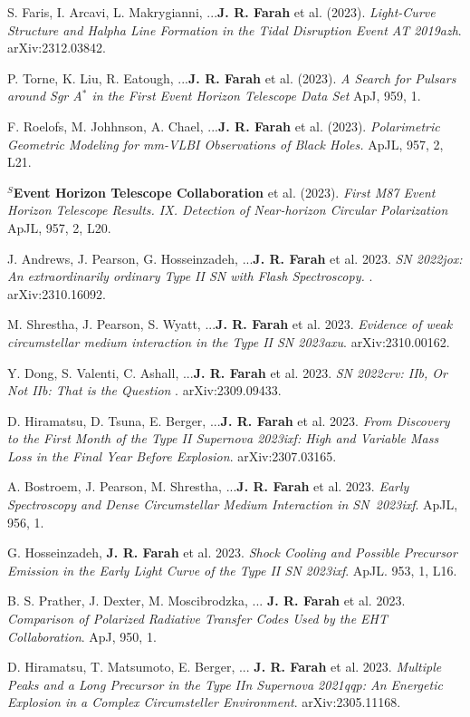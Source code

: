 \documentclass[margin,line]{res}
\begin{document}
\begin{resume}
S. Faris, I. Arcavi, L. Makrygianni, ...\textbf{J. R. Farah} et al. (2023). \textit{Light-Curve Structure and Halpha Line Formation in the Tidal Disruption Event AT 2019azh}. arXiv:2312.03842.

P. Torne, K. Liu, R. Eatough, ...\textbf{J. R. Farah} et al. (2023). \textit{ A Search for Pulsars around Sgr A$^\ast$ in the First Event Horizon Telescope Data Set } ApJ, 959, 1.

F. Roelofs, M. Johhnson, A. Chael, ...\textbf{J. R. Farah} et al. (2023). \textit{ Polarimetric Geometric Modeling for mm-VLBI Observations of Black Holes. } ApJL, 957, 2, L21.

\textbf{$^S$Event Horizon Telescope Collaboration} et al. (2023). \textit{First M87 Event Horizon Telescope Results. IX. Detection of Near-horizon Circular Polarization} ApJL, 957, 2, L20.

J. Andrews, J. Pearson, G. Hosseinzadeh, ...\textbf{J. R. Farah} et al. 2023. \textit{ SN 2022jox: An extraordinarily ordinary Type II SN with Flash Spectroscopy. }. arXiv:2310.16092.

M. Shrestha, J. Pearson, S. Wyatt, ...\textbf{J. R. Farah} et al. 2023. \textit{Evidence of weak circumstellar medium interaction in the Type II SN 2023axu}. arXiv:2310.00162.

Y. Dong, S. Valenti, C. Ashall, ...\textbf{J. R. Farah} et al. 2023. \textit{ SN 2022crv: IIb, Or Not IIb: That is the Question }. arXiv:2309.09433.

D. Hiramatsu, D. Tsuna, E. Berger, ...\textbf{J. R. Farah} et al. 2023. \textit{From Discovery to the First Month of the Type II Supernova 2023ixf: High and Variable Mass Loss in the Final Year Before Explosion}. arXiv:2307.03165.

A. Bostroem, J. Pearson, M. Shrestha, ...\textbf{J. R. Farah} et al. 2023. \textit{Early Spectroscopy and Dense Circumstellar Medium Interaction in SN~2023ixf}. ApJL, 956, 1.

G. Hosseinzadeh, \textbf{J. R. Farah} et al. 2023. \textit{Shock Cooling and Possible Precursor Emission in the Early Light Curve of the Type II SN 2023ixf}. ApJL. 953, 1, L16.  

B. S. Prather, J. Dexter, M. Moscibrodzka,  ... \textbf{J. R. Farah} et al. 2023. \textit{Comparison of Polarized Radiative Transfer Codes Used by the EHT Collaboration}. ApJ, 950, 1.

D. Hiramatsu, T. Matsumoto, E. Berger, ... \textbf{J. R. Farah} et al. 2023. \textit{Multiple Peaks and a Long Precursor in the Type IIn Supernova 2021qqp: An Energetic Explosion in a Complex Circumsteller Environment}. arXiv:2305.11168. 


\end{resume}
\end{document}
